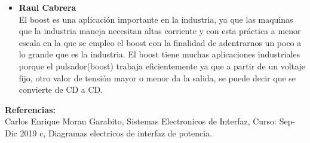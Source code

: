\documentclass[12pt,letterpaper]{article}
\begin{document}
\begin{itemize}
\item \textbf{Raul Cabrera}\\
El boost es una aplicación importante en la industria, ya que las maquinas que la industria maneja necesitan altas corriente y con esta práctica a menor escala en la que se empleo el boost con la finalidad de adentrarnos un poco a lo grande que es la industria. El boost tiene muchas aplicaciones industriales porque el pulsador(boost) trabaja eficientemente ya que a partir de un voltaje fijo, otro valor de tensión mayor o menor da la salida, se puede decir que se convierte de CD a CD.
\end{itemize}
\textbf{\Large Referencias:}\\

Carlos Enrique Moran Garabito, Sistemas Electronicos de Interfaz, Curso: Sep-Dic 2019 c, Diagramas electricos de interfaz de potencia.
\end{document}
